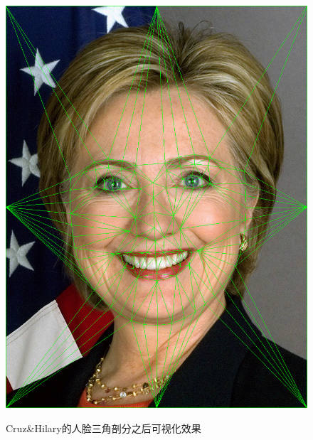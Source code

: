 \documentclass[a4paper]{article}
\begin{document}
\begin{figure}[htp]
{\begin{minipage}[b]{0.45\columnwidth}
{\includegraphics[width=1\columnwidth]{dt.png}
}
\label{fig:3-2:c}
\end{minipage}
}
\caption{Cruz\&Hilary的人脸三角剖分之后可视化效果}
\label{fig:3-2}
\end{figure}
\end{document}
